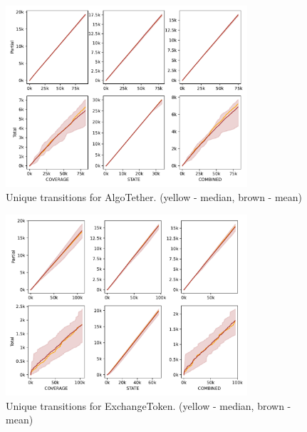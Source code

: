\begin{figure}[htbp]
    \centering
    \includegraphics*[width=0.8\textwidth]{charts/AlgoTether_range_trans copy.pdf}
    \caption{Unique transitions for AlgoTether. (yellow - median, brown - mean)}
    \label{fig:atrangetrans}
\end{figure}


\begin{figure}[htbp]
    \centering
    \includegraphics*[width=0.8\textwidth]{charts/ExchangeToken_range_trans copy.pdf}
    \caption{Unique transitions for ExchangeToken. (yellow - median, brown - mean)}
    \label{fig:etrangetrans}
\end{figure}